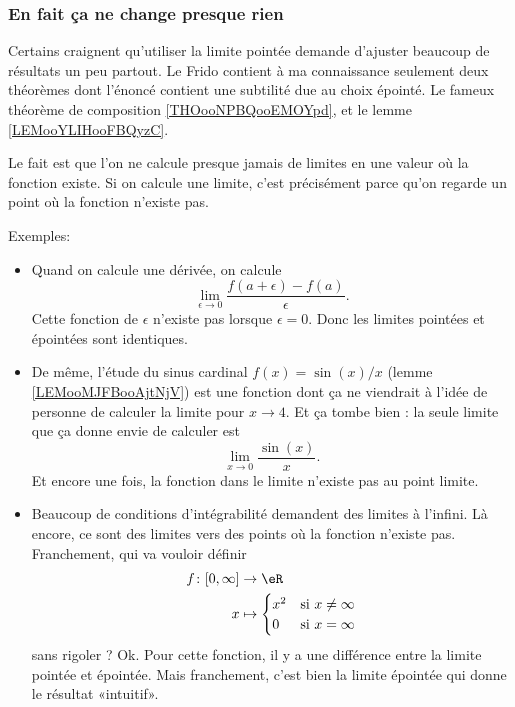 \subsubsection{En fait ça ne change presque rien}

Certains craignent qu'utiliser la limite pointée demande d'ajuster beaucoup de résultats un peu partout\cite{BIBooTOVWooSDsNrc}. Le Frido contient à ma connaissance seulement deux théorèmes dont l'énoncé contient une subtilité due au choix épointé. Le fameux théorème de composition \ref{THOooNPBQooEMOYpd}, et le lemme \ref{LEMooYLIHooFBQyzC}.

Le fait est que l'on ne calcule presque jamais de limites en une valeur où la fonction existe. Si on calcule une limite, c'est précisément parce qu'on regarde un point où la fonction n'existe pas.

Exemples:
\begin{itemize}
	\item Quand on calcule une dérivée, on calcule
	      \begin{equation}
		      \lim_{\epsilon\to 0}\frac{ f(a+\epsilon)-f(a) }{ \epsilon }.
	      \end{equation}
	      Cette fonction de \( \epsilon\) n'existe pas lorsque \( \epsilon=0\). Donc les limites pointées et épointées sont identiques.
	\item
	      De même, l'étude du sinus cardinal \( f(x)=\sin(x)/x\) (lemme \ref{LEMooMJFBooAjtNjV}) est une fonction dont ça ne viendrait à l'idée de personne de calculer la limite pour \( x\to 4\). Et ça tombe bien : la seule limite que ça donne envie de calculer est
	      \begin{equation}
		      \lim_{x\to 0} \frac{ \sin(x) }{ x }.
	      \end{equation}
	      Et encore une fois, la fonction dans le limite n'existe pas au point limite.
	\item
	      Beaucoup de conditions d'intégrabilité demandent des limites à l'infini. Là encore, ce sont des limites vers des points où la fonction n'existe pas. Franchement, qui va vouloir définir
	      \begin{equation}
		      \begin{aligned}
			      f\colon \mathopen[ 0 , \infty \mathclose] & \to \eR                            \\
			      x                                         & \mapsto \begin{cases}
				      x^2 & \text{si } x\neq \infty \\
				      0   & \text{si } x=\infty
			      \end{cases}
		      \end{aligned}
	      \end{equation}
	      sans rigoler ?  Ok. Pour cette fonction, il y a une différence entre la limite pointée et épointée. Mais franchement, c'est bien la limite épointée qui donne le résultat «intuitif».
\end{itemize}

